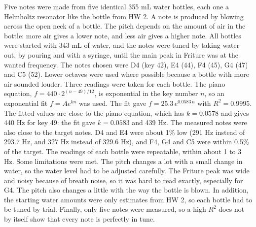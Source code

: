 \documentclass[11pt]{article}
\begin{document}
\vspace{0.4em}
\noindent
Five notes were made from five identical 355 mL water bottles, each one a Helmholtz resonator like the bottle from HW 2. A note is produced by blowing across the open neck of a bottle. The pitch depends on the amount of air in the bottle: more air gives a lower note, and less air gives a higher note.
All bottles were started with 343 mL of water, and the notes were tuned by taking water out, by pouring and with a syringe, until the main peak in Friture was at the wanted frequency. The notes chosen were D4 (key 42), E4 (44), F4 (45), G4 (47) and C5 (52). Lower octaves were used where possible because a bottle with more air sounded louder.
Three readings were taken for each bottle.
The piano equation, $f = 440\cdot2^{(n-49)/12}$, is exponential in the key number $n$, so an exponential fit $f = Ae^{kn}$ was used. The fit gave $f = 25.3\,e^{0.0583\,n}$ with $R^2 = 0.9995$.
The fitted values are close to the piano equation, which has $k = 0.0578$ and gives 440 Hz for key 49: the fit gave $k = 0.0583$ and 439 Hz.
The measured notes were also close to the target notes. D4 and E4 were about 1\% low (291 Hz instead of 293.7 Hz, and 327 Hz instead of 329.6 Hz), and F4, G4 and C5 were within 0.5\% of the target.
The readings of each bottle were repeatable, within about 1 to 3 Hz.
Some limitations were met. The pitch changes a lot with a small change in water, so the water level had to be adjusted carefully. The Friture peak was wide and noisy because of breath noise, so it was hard to read exactly, especially for G4. The pitch also changes a little with the way the bottle is blown.
In addition, the starting water amounts were only estimates from HW 2, so each bottle had to be tuned by trial. Finally, only five notes were measured, so a high $R^2$ does not by itself show that every note is perfectly in tune.
\end{document}
